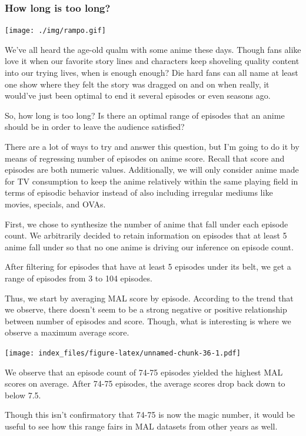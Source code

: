 \documentclass[
]{article}
\begin{document}
\hypertarget{how-long-is-too-long}{%
\subsubsection{How long is too long?}\label{how-long-is-too-long}}

\texttt{[image: ./img/rampo.gif]}

We've all heard the age-old qualm with some anime these days. Though
fans alike love it when our favorite story lines and characters keep
shoveling quality content into our trying lives, when is enough enough?
Die hard fans can all name at least one show where they felt the story
was dragged on and on when really, it would've just been optimal to end
it several episodes or even seasons ago.

So, how long is too long? Is there an optimal range of episodes that an
anime should be in order to leave the audience satisfied?

There are a lot of ways to try and answer this question, but I'm going
to do it by means of regressing number of episodes on anime score.
Recall that score and episodes are both numeric values. Additionally, we
will only consider anime made for TV consumption to keep the anime
relatively within the same playing field in terms of episodic behavior
instead of also including irregular mediums like movies, specials, and
OVAs.

First, we chose to synthesize the number of anime that fall under each
episode count. We arbitrarily decided to retain information on episodes
that at least 5 anime fall under so that no one anime is driving our
inference on episode count.

After filtering for episodes that have at least 5 episodes under its
belt, we get a range of episodes from 3 to 104 episodes.

Thus, we start by averaging MAL score by episode. According to the trend
that we observe, there doesn't seem to be a strong negative or positive
relationship between number of episodes and score. Though, what is
interesting is where we observe a maximum average score.

\texttt{[image: index\_files/figure-latex/unnamed-chunk-36-1.pdf]}

We observe that an episode count of 74-75 episodes yielded the highest
MAL scores on average. After 74-75 episodes, the average scores drop
back down to below 7.5.

Though this isn't confirmatory that 74-75 is now the magic number, it
would be useful to see how this range fairs in MAL datasets from other
years as well.
\end{document}

